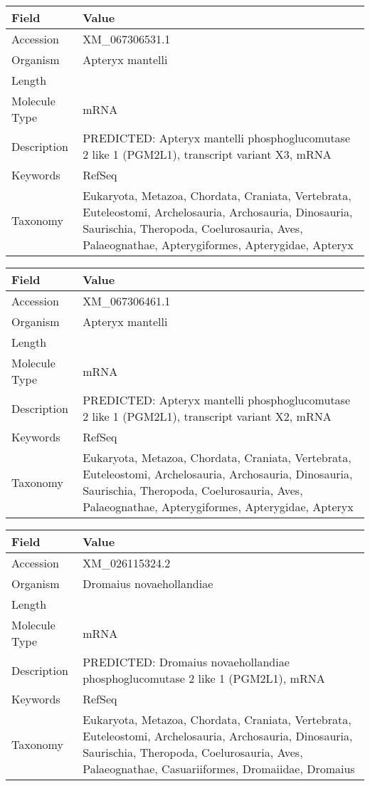 \documentclass[10pt]{article}
\begin{document}
{\footnotesize
\begin{longtable}{>{\raggedright\arraybackslash}p{4.5cm} >{\raggedright\arraybackslash}p{11.5cm}}
\textbf{Field} & \textbf{Value} \\
\hline
Accession & XM\_067306531.1 \\
Organism & Apteryx mantelli \\
Length & 6203 \\
Molecule Type & mRNA \\
Description & PREDICTED: Apteryx mantelli phosphoglucomutase 2 like 1 (PGM2L1), transcript variant X3, mRNA \\
Keywords & RefSeq \\
Taxonomy & Eukaryota, Metazoa, Chordata, Craniata, Vertebrata, Euteleostomi, Archelosauria, Archosauria, Dinosauria, Saurischia, Theropoda, Coelurosauria, Aves, Palaeognathae, Apterygiformes, Apterygidae, Apteryx \\
\end{longtable}
}

{\footnotesize
\begin{longtable}{>{\raggedright\arraybackslash}p{4.5cm} >{\raggedright\arraybackslash}p{11.5cm}}
\textbf{Field} & \textbf{Value} \\
\hline
Accession & XM\_067306461.1 \\
Organism & Apteryx mantelli \\
Length & 6278 \\
Molecule Type & mRNA \\
Description & PREDICTED: Apteryx mantelli phosphoglucomutase 2 like 1 (PGM2L1), transcript variant X2, mRNA \\
Keywords & RefSeq \\
Taxonomy & Eukaryota, Metazoa, Chordata, Craniata, Vertebrata, Euteleostomi, Archelosauria, Archosauria, Dinosauria, Saurischia, Theropoda, Coelurosauria, Aves, Palaeognathae, Apterygiformes, Apterygidae, Apteryx \\
\end{longtable}
}

{\footnotesize
\begin{longtable}{>{\raggedright\arraybackslash}p{4.5cm} >{\raggedright\arraybackslash}p{11.5cm}}
\textbf{Field} & \textbf{Value} \\
\hline
Accession & XM\_026115324.2 \\
Organism & Dromaius novaehollandiae \\
Length & 6620 \\
Molecule Type & mRNA \\
Description & PREDICTED: Dromaius novaehollandiae phosphoglucomutase 2 like 1 (PGM2L1), mRNA \\
Keywords & RefSeq \\
Taxonomy & Eukaryota, Metazoa, Chordata, Craniata, Vertebrata, Euteleostomi, Archelosauria, Archosauria, Dinosauria, Saurischia, Theropoda, Coelurosauria, Aves, Palaeognathae, Casuariiformes, Dromaiidae, Dromaius \\
\end{longtable}
}
\end{document}
